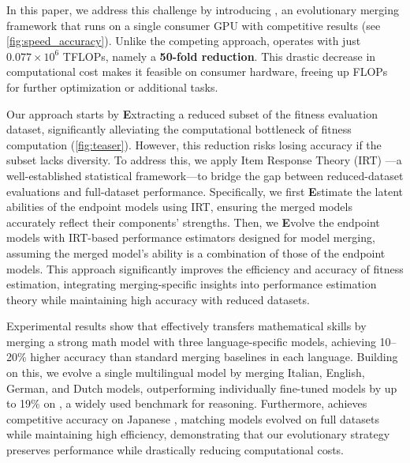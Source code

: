 In this paper, we address this challenge by introducing \approachns{}, an evolutionary merging framework that runs on a single consumer GPU with competitive results (see \cref{fig:speed_accuracy}). Unlike the competing approach, \approachns{} operates with just $0.077 \times 10^6$ TFLOPs, namely a {\bf 50-fold reduction}. This drastic decrease in computational cost makes it feasible on consumer hardware, freeing up FLOPs for further optimization or additional tasks.

Our approach starts by \textbf{E}xtracting a reduced subset of the fitness evaluation dataset, significantly alleviating the computational bottleneck of fitness computation (\cref{fig:teaser}). However, this reduction risks losing accuracy if the subset lacks diversity. To address this, we apply Item Response Theory (IRT) \cite{lord1968statistical}—a well-established statistical framework—to bridge the gap between reduced-dataset evaluations and full-dataset performance.
%
Specifically, we first \textbf{E}stimate the latent abilities of the endpoint models using IRT, ensuring the merged models accurately reflect their components' strengths. Then, we \textbf{E}volve the endpoint models with IRT-based performance estimators designed for model merging, assuming the merged model’s ability is a combination of those of the endpoint models. This approach significantly improves the efficiency and accuracy of fitness estimation, integrating merging-specific insights into performance estimation theory while maintaining high accuracy with reduced datasets.

Experimental results show that \approachns{} effectively transfers mathematical skills by merging a strong math model with three language-specific models, achieving 10–20\% higher accuracy than standard merging baselines in each language. Building on this, we evolve a single multilingual model by merging Italian, English, German, and Dutch models, outperforming individually fine-tuned models by up to 19\% on  \cite{ARC}, a widely used benchmark for reasoning.
Furthermore, \approachns{} achieves competitive accuracy on Japanese  \cite{gsm8k}, matching models evolved on full datasets while maintaining high efficiency, demonstrating that our evolutionary strategy preserves performance while drastically reducing computational costs.

